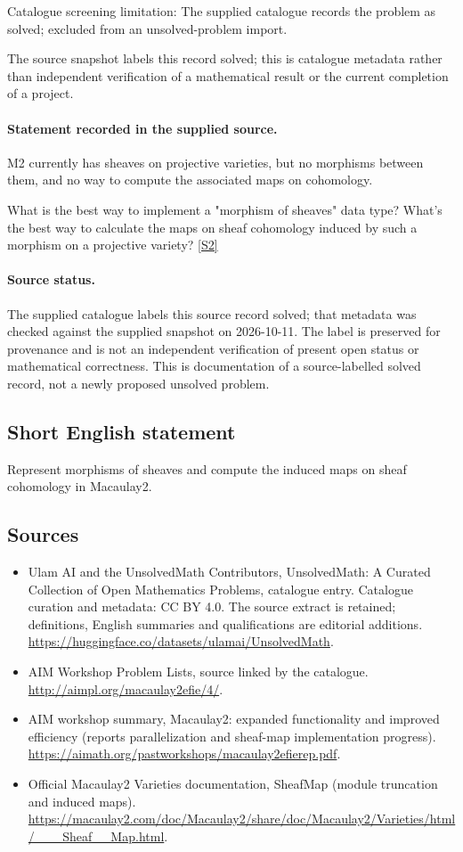 \documentclass[11pt]{article}
\begin{document}
Catalogue screening limitation: The supplied catalogue records the problem as solved; excluded from an unsolved-problem import.

The source snapshot labels this record solved; this is catalogue metadata rather than independent verification of a mathematical result or the current completion of a project.
\paragraph{Statement recorded in the supplied source.}
M2 currently has sheaves on projective varieties, but no morphisms between them, and no way to compute the associated maps on cohomology.

What is the best way to implement a "morphism of sheaves" data type? What's the best way to calculate the maps on sheaf cohomology induced by such a morphism on a projective variety? \href{http://aimpl.org/macaulay2efie/4/}{[S2]}
\paragraph{Source status.}
The supplied catalogue labels this source record solved; that metadata was checked against the supplied snapshot on 2026-10-11. The label is preserved for provenance and is not an independent verification of present open status or mathematical correctness. This is documentation of a source-labelled solved record, not a newly proposed unsolved problem.
\subsection{Short English statement}
Represent morphisms of sheaves and compute the induced maps on sheaf cohomology in Macaulay2.
\subsection{Sources}
\begin{itemize}
\item[S1] Ulam AI and the UnsolvedMath Contributors, UnsolvedMath: A Curated Collection of Open Mathematics Problems, catalogue entry. Catalogue curation and metadata: CC BY 4.0. The source extract is retained; definitions, English summaries and qualifications are editorial additions.
\url{https://huggingface.co/datasets/ulamai/UnsolvedMath}.
\item[S2] AIM Workshop Problem Lists, source linked by the catalogue.
\url{http://aimpl.org/macaulay2efie/4/}.
\item[S3] AIM workshop summary, Macaulay2: expanded functionality and improved efficiency (reports parallelization and sheaf-map implementation progress).
\url{https://aimath.org/pastworkshops/macaulay2efierep.pdf}.
\item[S4] Official Macaulay2 Varieties documentation, SheafMap (module truncation and induced maps).
\url{https://macaulay2.com/doc/Macaulay2/share/doc/Macaulay2/Varieties/html/___Sheaf__Map.html}.
\end{itemize}
\end{document}
